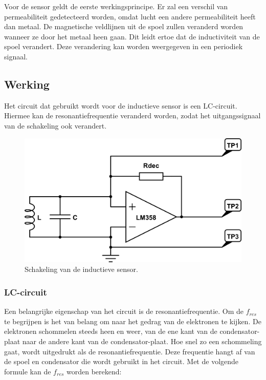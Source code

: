 \documentclass{report}
\begin{document}
Voor de sensor geldt de eerste werkingsprincipe. Er zal een verschil van permeabiliteit gedetecteerd worden, omdat lucht een andere permeabiliteit heeft dan metaal. De magnetische veldlijnen uit de spoel zullen veranderd worden wanneer ze door het metaal heen gaan. Dit leidt ertoe dat de inductiviteit van de spoel verandert. Deze verandering kan worden weergegeven in een periodiek signaal.

\newpage
\subsection{Werking}

Het circuit dat gebruikt wordt voor de inductieve sensor is een LC-circuit. Hiermee kan de resonantiefrequentie veranderd worden, zodat het uitgangssignaal van de schakeling ook verandert.

\begin{figure}[H]
\centering
\includegraphics[scale=0.45]{inductieve_sensor.png}
\caption{Schakeling van de inductieve sensor.}
\label{fig:schakeling_sensor}
\end{figure}

\subsubsection{LC-circuit}
Een belangrijke eigenschap van het circuit is de resonantiefrequentie. Om de $f_{res}$ te begrijpen is het van belang om naar het gedrag van de elektronen te kijken. De elektronen schommelen steeds heen en weer, van de ene kant van de condensator-plaat naar de andere kant van de condensator-plaat. Hoe snel zo een schommeling gaat, wordt uitgedrukt als de resonantiefrequentie. Deze frequentie hangt af van de spoel en condensator die wordt gebruikt in het circuit. Met de volgende formule kan de $f_{res}$ worden berekend:
\end{document}
